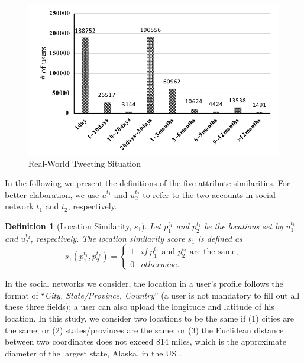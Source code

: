 \documentclass[letterpaper,12pt]{article}
\newtheorem{definition}{Definition}
\begin{document}
\begin{figure}[!htb]
  \includegraphics[width=\textwidth]{distribution3.pdf}
  \caption{Real-World Tweeting Situation}
  \label{fig:timediff}
\end{figure}

In the following we present the definitions of the five attribute similarities. For better elaboration, we use $u_1^{t_1}$ and $u_2^{t_2}$ to refer to the two accounts in social network $t_1$ and $t_2$, respectively. 

\noindent \theoremstyle{definition}
\begin{definition}[Location Similarity, $s_1$]
Let $p_{1}^{t_1}$ and $p_{2}^{t_2}$ be the locations set by $u_{1}^{t_1}$ and $u_{2}^{t_2}$, respectively. The location similarity score $s_1$ is defined as
\begin{equation}
s_1(p_{1}^{t_1},p_{2}^{t_2})=
\begin{cases}
1 & if\ p_{1}^{t_1} \mbox{ and } p_{2}^{t_2} \mbox{ are the same},\\
0 & otherwise.
\end{cases}
\end{equation}
\label{def:loc}
\end{definition}
In the social networks we consider, the location in a user's profile follows the format of ``\textit{City, State/Province, Country}'' (a user is not mandatory to fill out all these three fields); a user can also upload the longitude and latitude of his location. In this study, we consider two locations to be the same if (1) cities are the same; or (2) states/provinces are the same; or (3) the Euclidean distance between two coordinates does not exceed 814 miles, which is the approximate diameter of the largest state, Alaska, in the US \cite{alaska}.
\end{document}
